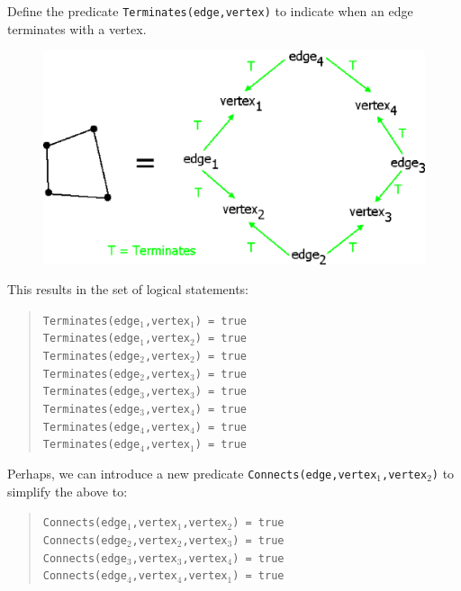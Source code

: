 Define the predicate \texttt{Terminates(edge,vertex)}  to indicate when an edge terminates with a vertex.

\begin{figure}[H]
\centering
\includegraphics[scale=0.6, bb=0 0 608 340]{Quadrilateral.eps}
\end{figure}

This results in the set of logical statements:
\begin{quote}

\texttt{Terminates(edge$_1$,vertex$_1$) = true
\\
    Terminates(edge$_1$,vertex$_2$) = true
\\
    Terminates(edge$_2$,vertex$_2$) = true 
\\
    Terminates(edge$_2$,vertex$_3$) = true 
\\
    Terminates(edge$_3$,vertex$_3$) = true
\\
    Terminates(edge$_3$,vertex$_4$) = true 
\\
    Terminates(edge$_4$,vertex$_4$) = true 
\\
    Terminates(edge$_4$,vertex$_1$) = true
  }
\end{quote}

Perhaps, we can introduce a new predicate \texttt{Connects(edge,vertex$_1$,vertex$_2$)} to simplify the above to:
\begin{quote}

\texttt{Connects(edge$_1$,vertex$_1$,vertex$_2$) = true
\\
    Connects(edge$_2$,vertex$_2$,vertex$_3$) = true
\\
    Connects(edge$_3$,vertex$_3$,vertex$_4$) = true
\\
    Connects(edge$_4$,vertex$_4$,vertex$_1$) = true}
\end{quote}

